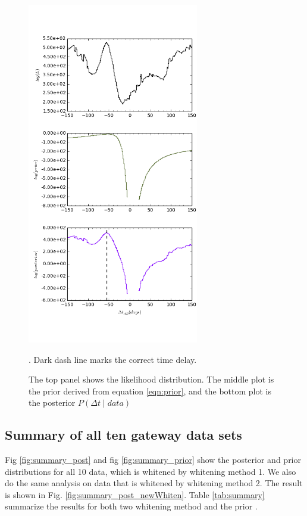 \documentclass[\docopts]{\docclass}
\begin{document}
\begin{enumerate}
\begin{figure}[!h]
\includegraphics[width=\textwidth, height=15cm, keepaspectratio]{data1_full_log.png}
\caption{The top panel shows the likelihood distribution. The middle plot is the prior derived from equation \ref{eqn:prior}, and the bottom plot is the posterior $P(\Delta t \mid data)$ }. Dark dash line marks the correct time delay.
\label{fig:log_data1}
\end{figure}
\end{enumerate}


\subsection{Summary of all ten gateway data sets}
Fig \ref{fig:summary_post} and fig \ref{fig:summary_prior} show the posterior and prior distributions for all 10 data, which is whitened by whitening method 1. We also do the same analysis on data that is whitened by whitening method 2. The result is shown in Fig. \ref{fig:summary_post_newWhiten}.  Table  \ref{tab:summary}  summarize the results  for both two whitening method and the prior .
\end{document}
